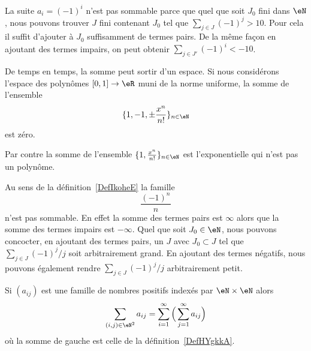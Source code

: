 \begin{example}
    La suite \( a_i=(-1)^i\) n'est pas sommable parce que quel que soit \( J_0\) fini dans \( \eN\), nous pouvons trouver \( J\) fini contenant \( J_0\) tel que \( \sum_{j\in J}(-1)^j>10\). Pour cela il suffit d'ajouter à \( J_0\) suffisamment de termes pairs. De la même façon en ajoutant des termes impairs, on peut obtenir \( \sum_{j\in J'}(-1)^i<-10\).
\end{example}

\begin{example}
    De temps en temps, la somme peut sortir d'un espace. Si nous considérons l'espace des polynômes \( \mathopen[ 0 , 1 \mathclose]\to \eR\) muni de la norme uniforme, la somme de l'ensemble
    \begin{equation}
        \{ 1,-1,\pm\frac{ x^n }{ n! } \}_{n\in \eN}
    \end{equation}
    est zéro.

    Par contre la somme de l'ensemble \( \{ 1,\frac{ x^n }{ n! } \}_{n\in \eN}\) est l'exponentielle qui n'est pas un polynôme.
\end{example}

\begin{example}     \label{EXooULLXooTDFYqf}
    Au sens de la définition~\ref{DefIkoheE} la famille
    \begin{equation}
        \frac{ (-1)^n }{ n }
    \end{equation}
    n'est pas sommable. En effet la somme des termes pairs est \( \infty\) alors que la somme des termes impairs est \( -\infty\). Quel que soit \( J_0\in \eN\), nous pouvons concocter, en ajoutant des termes pairs, un \( J\) avec \( J_0\subset J\) tel que \( \sum_{j\in J}(-1)^j/j\) soit arbitrairement grand. En ajoutant des termes négatifs, nous pouvons également rendre \( \sum_{j\in J}(-1)^j/j\) arbitrairement petit.
\end{example}

\begin{proposition} \label{PropVQCooYiWTs}
    Si \( (a_{ij})\) est une famille de nombres positifs indexés par \( \eN\times \eN\) alors
    \begin{equation}
        \sum_{(i,j)\in \eN^2}a_{ij}=\sum_{i=1}^{\infty}\Big( \sum_{j=1}^{\infty}a_{ij} \Big)
    \end{equation}
    où la somme de gauche est celle de la définition~\ref{DefHYgkkA}.
\end{proposition}

